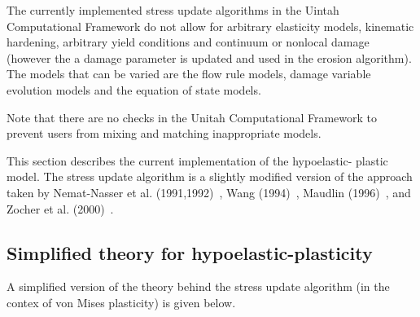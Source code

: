 The currently implemented stress update algorithms in the Uintah
Computational Framework do not allow for arbitrary elasticity models,
kinematic hardening, arbitrary yield conditions and continuum or 
nonlocal damage (however the a damage parameter is updated and 
used in the erosion algorithm).  The models that can be varied
are the flow rule models, damage variable evolution models and the
equation of state models.

Note that there are no checks in the Unitah Computational Framework
to prevent users from mixing and matching inappropriate models.

This section describes the current implementation of the hypoelastic-
plastic model.  The stress update algorithm is a slightly modified 
version of the approach taken by 
Nemat-Nasser et al. (1991,1992)~\cite{Nemat91,Nemat92}, Wang (1994)~\cite{Wang94}, 
Maudlin (1996)~\cite{Maudlin96}, and Zocher et al. (2000)~\cite{Zocher00}.  

\subsection{Simplified theory for hypoelastic-plasticity}
A simplified version of the theory behind the stress update algorithm
(in the contex of von Mises plasticity) is given below.

